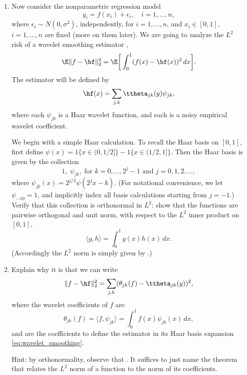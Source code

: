 \documentclass{article}
\begin{document}
\begin{enumerate}[label=(\alph*)]
\item Now consider the nonparametric regression model 
  \begin{equation}
  \label{eq:nonpar_model}
  y_i = f(x_i) + \epsilon_i, \quad i=1,\dots,n,
  \end{equation}
  where $\epsilon_i \sim N(0,\sigma^2)$, independently, for $i=1,\dots,n$, and
  $x_i \in [0,1]$, $i=1,\dots,n$ are fixed (more on them later). We are going to
  analyze the $L^2$ risk of a wavelet smoothing estimator \smash{$\hf$}, 
  \[
  \E \|f - \hf\|_2^2 = \E \bigg[ \int_0^1 (f(x) -  \hf(x))^2 \, dx \bigg].  
  \]
  The estimator \smash{$\hf$} will be defined by 
  \begin{equation}
  \label{eq:wavelet_smoothing}
  \hf(x) = \sum_{j,k} \ttheta_{jk}(y) \psi_{jk}, 
  \end{equation}
  where each $\psi_{jk}$ is a Haar wavelet function, and each
   is a noisy empirical wavelet coefficient.

  We begin with a simple Haar calculation. To recall the Haar basis on $[0,1]$, 
  first define $\psi(x) = 1\{x \in (0,1/2]\} - 1\{x \in (1/2,1]\}$. Then the
  Haar basis is given by the collection          
  \[
   1, \; \psi_{jk}, \; \text{for $k = 0, \dots, 2^j-1$ and $j = 0,1,2,\dots$},     
  \]
  where $\psi_{jk}(x) = 2^{j/2} \psi(2^j x - k)$. (For notational convenience,
  we let $\psi_{-10} = 1$, and implicitly index all basis calculations starting 
  from $j=-1$.) Verify that this collection is orthonormal in $L^2$: show that
  the functions are pairwise orthogonal and unit norm, with respect to the $L^2$
  inner product on $[0,1]$,   
  \marginpar{\small [2 pts]}
  \[
  \langle g, h \rangle = \int_0^1 g(x) h(x) \, dx.
  \]
  (Accordingly the $L^2$ norm is simply given by .)   

\item Explain why it is that we can write
  \marginpar{\small [1 pt]}
  \[
  \|f - \hf\|_2^2 = \sum_{j,k} (\theta_{jk}(f) - \ttheta_{jk}(y))^2,
  \]
  where the wavelet coefficients of $f$ are 
  \[
  \theta_{jk}(f) = \langle f, \psi_{jk} \rangle = \int_0^1 f(x) \psi_{jk}(x) \,
  dx,
  \]
  and  are the coefficients to define the estimator
  \smash{$\hf$} in its Haar basis expansion \eqref{eq:wavelet_smoothing}.    

  Hint: by orthonormality, observe that . It suffices to just name the theorem that relates the $L^2$
  norm of a function to the norm of its coefficients.   


\end{enumerate}
\end{document}
